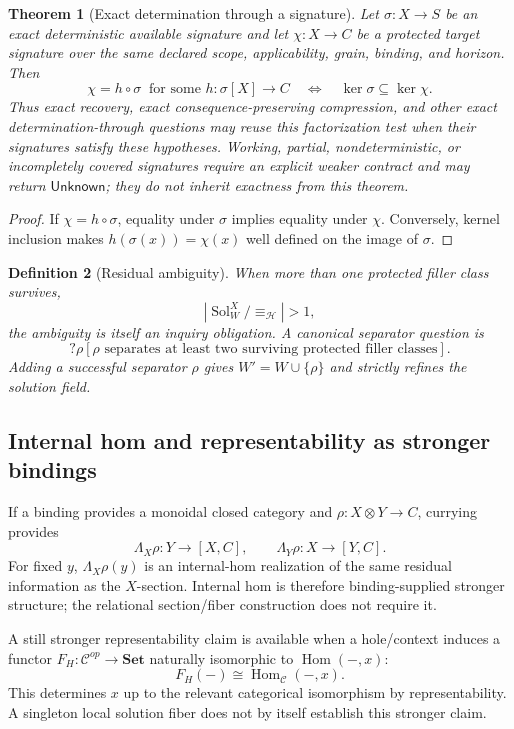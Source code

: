 \documentclass[11pt,oneside]{article}
\newtheorem{definition}{Definition}[section]
\newtheorem{theorem}[definition]{Theorem}
\begin{document}
\begin{theorem}[Exact determination through a signature]\label{thm:determine-through}
Let \(\sigma:X\to S\) be an exact deterministic available signature and let
\(\chi:X\to C\) be a protected target signature over the same declared scope,
applicability, grain, binding, and horizon.  Then
\[
\boxed{
\chi=h\circ\sigma\ \text{ for some }h:\sigma[X]\to C
\quad\Longleftrightarrow\quad
\ker\sigma\subseteq\ker\chi.
}
\]
Thus exact recovery, exact consequence-preserving compression, and other exact
determination-through questions may reuse this factorization test when their
signatures satisfy these hypotheses.  Working, partial, nondeterministic, or
incompletely covered signatures require an explicit weaker contract and may return
\(\mathsf{Unknown}\); they do not inherit exactness from this theorem.
\end{theorem}

\begin{proof}
If \(\chi=h\circ\sigma\), equality under \(\sigma\) implies equality under \(\chi\).
Conversely, kernel inclusion makes \(h(\sigma(x))=\chi(x)\) well defined on the image
of \(\sigma\).
\end{proof}

\begin{definition}[Residual ambiguity]
When more than one protected filler class survives,
\[
\left|\operatorname{Sol}^{X}_{W}/{\equiv_{\mathcal H}}\right|>1,
\]
the ambiguity is itself an inquiry obligation.  A canonical separator question is
\[
\boxed{
?\rho[
\rho\text{ separates at least two surviving protected filler classes}
].
}
\]
Adding a successful separator \(\rho\) gives \(W'=W\cup\{\rho\}\) and strictly refines the solution field.
\end{definition}

\subsection{Internal hom and representability as stronger bindings}

If a binding provides a monoidal closed category and \(\rho:X\otimes Y\to C\), currying provides
\[
\Lambda_X\rho:Y\to[X,C],
\qquad
\Lambda_Y\rho:X\to[Y,C].
\]
For fixed \(y\), \(\Lambda_X\rho(y)\) is an internal-hom realization of the same residual information as the \(X\)-section.  Internal hom is therefore binding-supplied stronger structure; the relational section/fiber construction does not require it.

A still stronger representability claim is available when a hole/context induces a functor \(F_H:\mathcal C^{op}\to\mathbf{Set}\) naturally isomorphic to \(\operatorname{Hom}(-,x)\):
\[
\boxed{
F_H(-)\cong\operatorname{Hom}_{\mathcal C}(-,x).
}
\]
This determines \(x\) up to the relevant categorical isomorphism by representability.  A singleton local solution fiber does not by itself establish this stronger claim.
\end{document}
